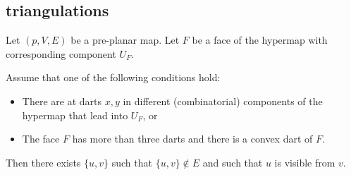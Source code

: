 \subsection{triangulations}

Let $(p,V,E)$ be a pre-planar map.  Let $F$ be a face of the hypermap
with corresponding component $U_F$.

\begin{lemma} Assume that one of the following conditions hold:
\begin{itemize} 
  \item There are at darts $x,y$ in different (combinatorial) components of the 
   hypermap that lead into $U_F$, or
  \item The face $F$ has more than three darts and there is a convex dart of $F$.
\end{itemize}
Then there exists $\{u,v\}$ such that $\{u,v\}\not\in E$ and such
that $u$ is visible from $v$.
\end{lemma}


